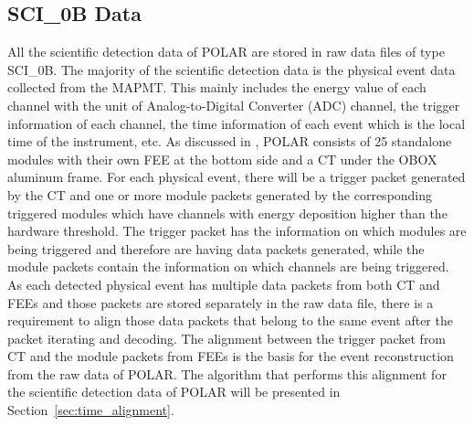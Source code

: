 \documentclass{raa}
\begin{document}
\subsection{SCI\_0B Data}
All the scientific detection data of POLAR are stored in raw data files of type SCI\_0B. The majority of the scientific detection data is the physical event data collected from the MAPMT. This mainly includes the energy value of each channel with the unit of Analog-to-Digital Converter (ADC) channel, the trigger information of each channel, the time information of each event which is the local time of the instrument, etc. As discussed in \citealt{Produit2017}, POLAR consists of 25 standalone modules with their own FEE at the bottom side and a CT under the OBOX aluminum frame. For each physical event, there will be a trigger packet generated by the CT and one or more module packets generated by the corresponding triggered modules which have channels with energy deposition higher than the hardware threshold. The trigger packet has the information on which modules are being triggered and therefore are having data packets generated, while the module packets contain the information on which channels are being triggered. As each detected physical event has multiple data packets from both CT and FEEs and those packets are stored separately in the raw data file, there is a requirement to align those data packets that belong to the same event  after the packet iterating and decoding. The alignment between the trigger packet from CT and the module packets from FEEs is the basis for the event reconstruction from the raw data of POLAR. The algorithm that performs this alignment for the scientific detection data of POLAR will be presented in Section~\ref{sec:time_alignment}.
\end{document}
